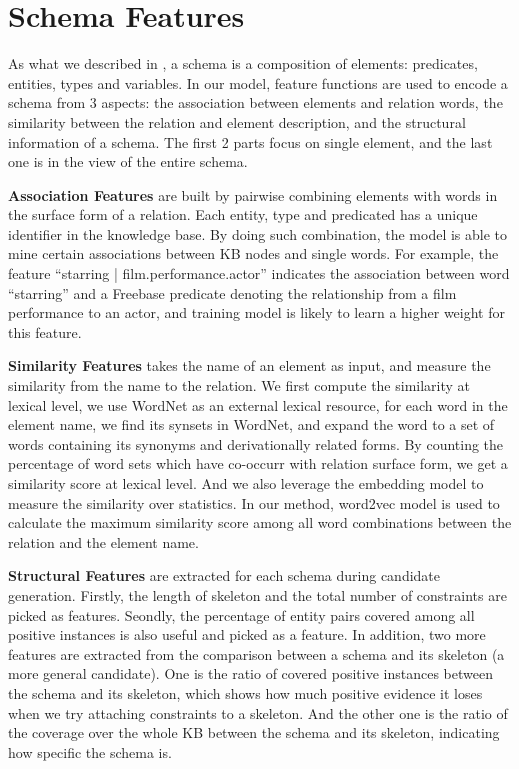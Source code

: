 \section{Schema Features}
\label{sec:feature}

As what we described in , a schema is a
composition of elements: predicates, entities, types and variables.
In our model, feature functions are used to encode a schema from
3 aspects: the association between elements and relation words,
the similarity between the relation and element description, and
the structural information of a schema.
The first 2 parts focus on single element, and the last one is in
the view of the entire schema.

\textbf{Association Features} are built by pairwise combining 
elements with words in the surface form of a relation.
Each entity, type and predicated has a unique identifier in the
knowledge base.
By doing such combination, the model is able to mine certain
associations between KB nodes and single words.
For example, the feature ``starring | film.performance.actor''
indicates the association between word ``starring'' and a Freebase
predicate denoting the relationship from a film performance to an
actor, and training model is likely to learn a higher weight for 
this feature.

\textbf{Similarity Features} takes the name of an element as input,
and measure the similarity from the name to the relation. 
We first compute the similarity at lexical level, we use WordNet as 
an external lexical resource, for each word in the element name,
we find its synsets in WordNet, and expand the word to a set of 
words containing its synonyms and derivationally related forms.
By counting the percentage of word sets which have co-occurr with 
relation surface form, we get a similarity score at lexical level.
And we also leverage the embedding model to measure the similarity
over statistics. 
In our method, word2vec model is used to calculate the maximum 
similarity score among all word combinations between the relation 
and the element name.

\textbf{Structural Features} are extracted for each schema during
candidate generation.
Firstly, the length of skeleton and the total number of constraints
are picked as features.
Seondly, the percentage of entity pairs covered among all positive 
instances is also useful and picked as a feature.
In addition, two more features are extracted from the comparison 
between a schema and its skeleton (a more general candidate).
One is the ratio of covered positive instances between the schema 
and its skeleton, which shows how much positive evidence it loses 
when we try attaching constraints to a skeleton.
And the other one is the ratio of the coverage over the whole KB 
between the schema and its skeleton, indicating how specific the
schema is.

